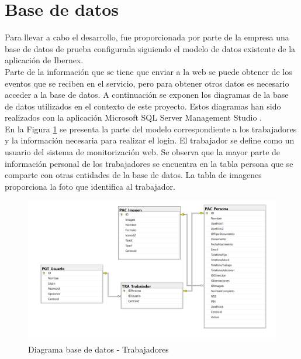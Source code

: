 \section{Base de datos}


Para llevar a cabo el desarrollo, fue proporcionada por parte de la empresa una base de datos de prueba configurada siguiendo el modelo de datos existente de la aplicación de Ibernex.\\

Parte de la información que se tiene que enviar a la web se puede obtener de los eventos que se reciben en el servicio, pero para obtener otros datos es necesario acceder a la base de datos. A continuación se exponen los diagramas de la base de datos utilizados en el contexto de este proyecto. Estos diagramas han sido realizados con la aplicación Microsoft SQL Server Management Studio \cite{sql-server-studio}. \\

En la Figura \ref{fig:Diagrama-BD-Login} se presenta la parte del modelo correspondiente a los trabajadores y la información necesaria para realizar el login. El trabajador se define como un usuario del sistema de monitorización web. Se observa que la mayor parte de información personal de los trabajadores se encuentra en la tabla persona que se comparte con otras entidades de la base de datos. La tabla de imagenes proporciona la foto que identifica al trabajador.

\begin{figure}[H]
    \centering
    \includegraphics[width=16cm]{Imagenes/Diagrama-BD-Login}
    \caption{Diagrama base de datos - Trabajadores}
    \label{fig:Diagrama-BD-Login}
\end{figure}

